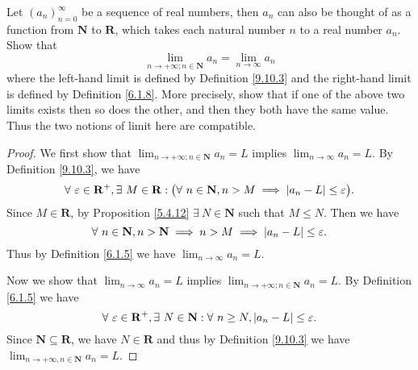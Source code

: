 \exercisesection

\begin{exercise}\label{ex 9.10.1}
    Let \((a_n)_{n = 0}^\infty\) be a sequence of real numbers, then \(a_n\) can also be thought of as a function from \(\mathbf{N}\) to \(\mathbf{R}\), which takes each natural number \(n\) to a real number \(a_n\).
    Show that
    \[
        \lim_{n \to +\infty ; n \in \mathbf{N}} a_n = \lim_{n \to \infty} a_n
    \]
    where the left-hand limit is defined by Definition \ref{9.10.3} and the right-hand limit is defined by Definition \ref{6.1.8}.
    More precisely, show that if one of the above two limits exists then so does the other, and then they both have the same value.
    Thus the two notions of limit here are compatible.
\end{exercise}

\begin{proof}
    We first show that \(\lim_{n \to +\infty ; n \in \mathbf{N}} a_n = L\) implies \(\lim_{n \to \infty} a_n = L\).
    By Definition \ref{9.10.3}, we have
    \[
        \forall\ \varepsilon \in \mathbf{R}^+, \exists\ M \in \mathbf{R} : \big(\forall\ n \in \mathbf{N}, n > M \implies \abs*{a_n - L} \leq \varepsilon\big).
    \]
    Since \(M \in \mathbf{R}\), by Proposition \ref{5.4.12} \(\exists\ N \in \mathbf{N}\) such that \(M \leq N\).
    Then we have
    \[
        \forall\ n \in \mathbf{N}, n > \mathbf{N} \implies n > M \implies \abs*{a_n - L} \leq \varepsilon.
    \]
    Thus by Definition \ref{6.1.5} we have \(\lim_{n \to \infty} a_n = L\).

    Now we show that \(\lim_{n \to \infty} a_n = L\) implies \(\lim_{n \to +\infty ; n \in \mathbf{N}} a_n = L\).
    By Definition \ref{6.1.5} we have
    \[
        \forall\ \varepsilon \in \mathbf{R}^+, \exists\ N \in \mathbf{N} : \forall\ n \geq N, \abs*{a_n - L} \leq \varepsilon.
    \]
    Since \(\mathbf{N} \subseteq \mathbf{R}\), we have \(N \in \mathbf{R}\) and thus by Definition \ref{9.10.3} we have \(\lim_{n \to +\infty, n \in \mathbf{N}} a_n = L\).
\end{proof}